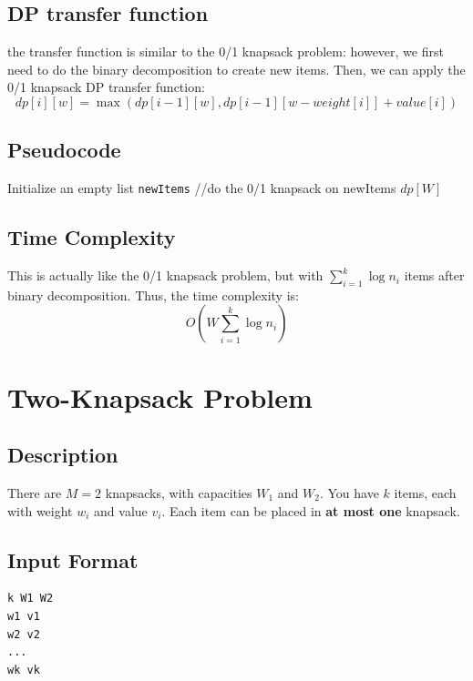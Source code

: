 \documentclass[a4paper,12pt]{article}
\begin{document}
\subsection{DP transfer function}
the transfer function is similar to the 0/1 knapsack problem:
however, we first need to do the binary decomposition to create new items.
Then, we can apply the 0/1 knapsack DP transfer function:
\[
dp[i][w] = \max(dp[i-1][w], dp[i-1][w - weight[i]] + value[i])
\]
\subsection*{Pseudocode}
\begin{algorithm}[H]
\caption{Bounded Knapsack using Binary Decomposition + 0/1 DP}

\BlankLine
Initialize an empty list \texttt{newItems}\;
\BlankLine
//do the 0/1 knapsack on newItems\;
\Return $dp[W]$\;
\end{algorithm}


\subsection*{Time Complexity}
This is actually like the 0/1 knapsack problem, but with $\sum_{i=1}^k \log n_i$ items after binary decomposition.
Thus, the time complexity is:
\[O\left(W \sum_{i=1}^k \log n_i\right)\]

\section{Two-Knapsack Problem}
\subsection*{Description}
There are $M=2$ knapsacks, with capacities $W_1$ and $W_2$.  
You have $k$ items, each with weight $w_i$ and value $v_i$.  
Each item can be placed in \textbf{at most one} knapsack.
\subsection{Input Format}
\begin{verbatim}
k W1 W2
w1 v1
w2 v2
...
wk vk
\end{verbatim}
\end{document}
